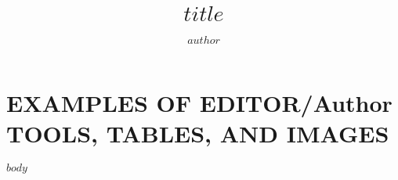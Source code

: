 \documentclass{ufdissertation}\sloppy
\title{$title$}%
\author{$author$}%
\begin{document}






\chapter{EXAMPLES OF EDITOR/Author TOOLS, TABLES, AND IMAGES}%


$body$
\end{document}
